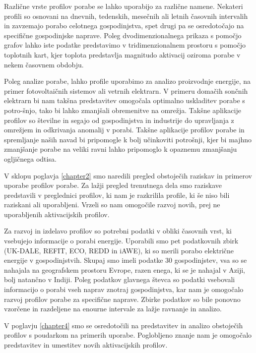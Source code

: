 \begin{sloabstract}
Različne vrste profilov porabe se lahko uporabijo za različne namene. Nekateri profili so osnovani na dnevnih, tedenskih, mesečnih ali letnih časovnih intervalih in zavzemajo porabo celotnega gospodinjstva, spet drugi pa se osredotočajo na specifične gospodinjske naprave. Poleg dvodimenzionalnega prikaza s pomočjo grafov lahko iste podatke predstavimo v tridimenzionalnem prostoru s pomočjo toplotnih kart, kjer toplota predstavlja magnitudo aktivacij oziroma porabe v nekem časovnem obdobju.  

Poleg analize porabe, lahko profile uporabimo za analizo proizvodnje energije, na primer fotovoltaičnih sistemov ali vetrnih elektrarn. V primeru domačih sončnih elektrarn bi nam takšna predstavitev omogočala optimalno uskladitev porabe s potro-šnjo, tako bi lahko zmanjšali obremenitve na omrežja. Takšne aplikacije profilov so številne in segajo od gospodinjstva in industrije do upravljanja z omrežjem in odkrivanja anomalij v porabi. Takšne aplikacije profilov porabe in spremljanje naših navad bi pripomogle k bolj učinkoviti potrošnji, kjer bi majhno zmanjšanje porabe na veliki ravni lahko pripomoglo k opaznemu zmanjšanju ogljičnega odtisa. 

V sklopu poglavja \ref{chapter2} smo naredili pregled obstoječih raziskav in primerov uporabe profilov porabe. Za lažji pregled trenutnega dela smo raziskave predstavili v preglednici profilov, ki nam je razkrilila profile, ki še niso bili raziskani ali uporabljeni. Vrzeli so nam omogočile razvoj novih, prej ne uporabljenih aktivacijskih profilov.  

Za razvoj in izdelavo profilov so potrebni podatki v obliki časovnih vrst, ki vsebujejo informacije o porabi energije. Uporabili smo pet podatkovnih zbirk (UK-DALE, REFIT, ECO, REDD in iAWE), ki so merili porabo električne energije v gospodinjstvih. Skupaj smo imeli podatke 30 gospodinjstev, vsa so se nahajala na geografskem prostoru Evrope, razen enega, ki se je nahajal v Aziji, bolj natančno v Indiji.  
Poleg podatkov glavnega števca so podatki vsebovali informacijo o porabi vseh naprav znotraj gospodinjstva, kar nam je omogočalo razvoj profilov porabe za specifične naprave. Zbirke podatkov so bile ponovno vzorčene in razdeljene na enourne intervale za lažje ravnanje in analizo.  

V poglavju \ref{chapter4} smo se osredotočili na predstavitev in analizo obstoječih profilov s poudarkom na primerih uporabe. Poglobljeno znanje nam je omogočalo predstavitev in umestitev novih aktivacijskih profilov.  


\end{sloabstract}

